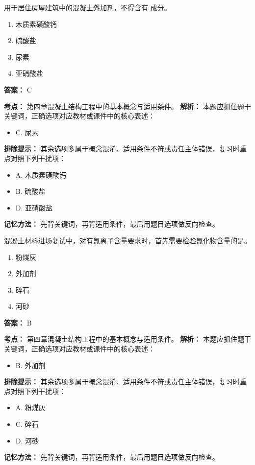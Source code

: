 \documentclass[UTF8,fontset=fandol,11pt]{ctexart}
\begin{document}
\begin{quizbox}[title={第 69 题}]
用于居住房屋建筑中的混凝土外加剂，不得含有 成分。\\
\begin{enumerate}[label=\Alph*.]
\item 木质素磺酸钙
\item 硫酸盐
\item 尿素
\item 亚硝酸盐
\end{enumerate}
\textbf{答案：} C
\vspace{0.25em}
\begin{answerbox}[title={考点解析}]
\textbf{考点：} 第四章混凝土结构工程中的基本概念与适用条件。
\textbf{解析：} 本题应抓住题干关键词，正确选项对应教材或课件中的核心表述：
\begin{itemize}
\item C. 尿素
\end{itemize}
\textbf{排除提示：} 其余选项多属于概念混淆、适用条件不符或责任主体错误，复习时重点对照下列干扰项：
\begin{itemize}
\item A. 木质素磺酸钙
\item B. 硫酸盐
\item D. 亚硝酸盐
\end{itemize}
\textbf{记忆方法：} 先背关键词，再背适用条件，最后用题目选项做反向检查。
\end{answerbox}
\end{quizbox}

\vspace{0.2em}

\begin{quizbox}[title={第 70 题}]
混凝土材料进场复试中，对有氯离子含量要求时，首先需要检验氯化物含量的是。\\
\begin{enumerate}[label=\Alph*.]
\item 粉煤灰
\item 外加剂
\item 碎石
\item 河砂
\end{enumerate}
\textbf{答案：} B
\vspace{0.25em}
\begin{answerbox}[title={考点解析}]
\textbf{考点：} 第四章混凝土结构工程中的基本概念与适用条件。
\textbf{解析：} 本题应抓住题干关键词，正确选项对应教材或课件中的核心表述：
\begin{itemize}
\item B. 外加剂
\end{itemize}
\textbf{排除提示：} 其余选项多属于概念混淆、适用条件不符或责任主体错误，复习时重点对照下列干扰项：
\begin{itemize}
\item A. 粉煤灰
\item C. 碎石
\item D. 河砂
\end{itemize}
\textbf{记忆方法：} 先背关键词，再背适用条件，最后用题目选项做反向检查。
\end{answerbox}
\end{quizbox}
\end{document}

